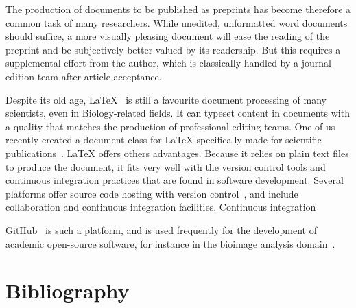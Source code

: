 The production of documents to be published as preprints has become therefore a common task of many researchers.
While unedited, unformatted word documents should suffice, a more visually pleasing document will ease the reading of the preprint and be subjectively better valued by its readership.
But this requires a supplemental effort from the author, which is classically handled by a journal edition team after article acceptance.

Despite its old age, LaTeX~\cite{Lamport1994} is still a favourite document processing of many scientists, even in Biology-related fields.
It can typeset content in documents with a quality that matches the production of professional editing teams.
One of us recently created a document class for LaTeX specifically made for scientific publications~\cite{HenriquesPreprintTemplate}.
LaTeX offers others advantages.
Because it relies on plain text files to produce the document, it fits very well with the version control tools and continuous integration practices that are found in software development.
Several platforms offer source code hosting with version control~\cite{SourceForge, Mercurial, GitHub, Bitbucket, GitLab}, and include collaboration  and continuous integration facilities. 
Continuous integration \TODO

GitHub~\cite{GitHub} is such a platform, and is used frequently for the development of academic open-source software, for instance in the bioimage analysis domain~\cite{FijiPaper, IcyPaper, ImgLib2Paper}.






\section*{Bibliography}


